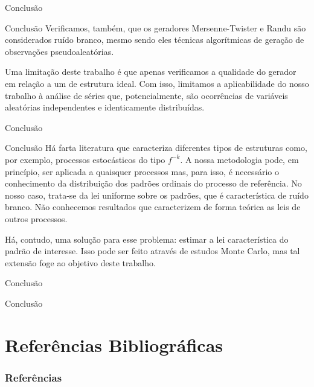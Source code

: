 \documentclass[10pt,xcolor={dvipsnames}]{beamer}
\begin{document}
\begin{frame}{Conclusão}{}
	\begin{block}{Conclusão}
	Verificamos, também, que os geradores Mersenne-Twister e Randu são considerados ruído branco, mesmo sendo eles técnicas algorítmicas de geração de observações pseudoaleatórias.
	\pause
	
	Uma limitação deste trabalho é que apenas verificamos a qualidade do gerador em relação a um de estrutura ideal.
	Com isso, limitamos a aplicabilidade do nosso trabalho à análise de séries que, potencialmente, são ocorrências de variáveis aleatórias independentes e identicamente distribuídas.	
	\end{block}
\end{frame}

\begin{frame}{Conclusão}{}
	\begin{block}{Conclusão}
	Há farta literatura que caracteriza diferentes tipos de estruturas como, por exemplo, processos estocásticos do tipo $f^{-k}$.
	A nossa metodologia pode, em princípio, ser aplicada a quaisquer processos mas, para isso, é necessário o conhecimento da distribuição dos padrões ordinais do processo de referência.
	No nosso caso, trata-se da lei uniforme sobre os padrões, que é característica de ruído branco.
	Não conhecemos resultados que caracterizem de forma teórica as leis de outros processos.
	\pause
	
	Há, contudo, uma solução para esse problema: estimar a lei característica do padrão de interesse.
	Isso pode ser feito através de estudos Monte Carlo, mas tal extensão foge ao objetivo deste trabalho.
	\end{block}
\end{frame}

\begin{frame}{Conclusão}{}
	\begin{block}{Conclusão}
		
	\end{block}
\end{frame}


\section{Referências Bibliográficas}
\begin{frame}[allowframebreaks]
	\frametitle{Referências}
%	
%	
	
\end{frame}

{\1
\begin{frame}
\end{frame}}
\end{document}
